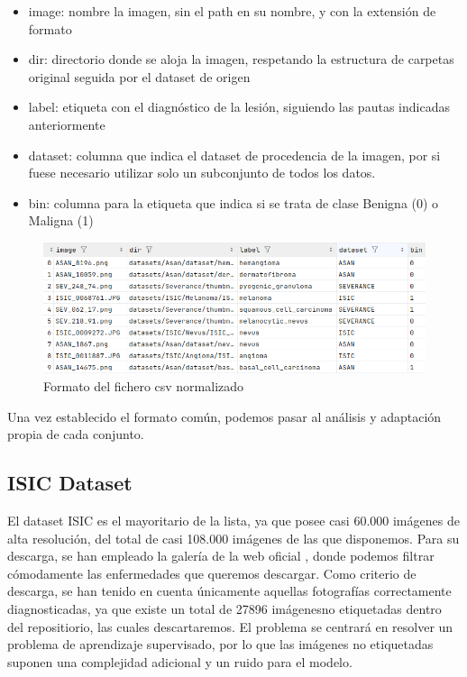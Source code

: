\begin{itemize}
	\item image: nombre la imagen, sin el path en su nombre, y con la extensión de formato
	\item dir: directorio donde se aloja la imagen, respetando la estructura de carpetas original seguida por el dataset de origen
	\item label: etiqueta con el diagnóstico de la lesión, siguiendo las pautas indicadas anteriormente
	\item dataset: columna que indica el dataset de procedencia de la imagen, por si fuese necesario utilizar solo un subconjunto de todos los datos.
	\item bin: columna para la etiqueta que indica si se trata de clase Benigna (0) o Maligna (1)
\end{itemize}

\begin{figure}[H]
	\centering
	\includegraphics[scale = 0.55]{imagenes/formatocsv.png}
	\caption{Formato del fichero csv normalizado}
	\label {formatocsv}
\end{figure}

Una vez establecido el formato común, podemos pasar al análisis y adaptación propia de cada conjunto.

\subsection{ISIC Dataset}

El dataset ISIC es el mayoritario de la lista, ya que posee casi 60.000 imágenes de alta resolución, del total de casi 108.000 imágenes de las que disponemos. Para su descarga, se han empleado la galería de la web oficial \cite{isicarchive}, donde podemos filtrar cómodamente las enfermedades que queremos descargar. Como criterio de descarga, se han tenido en cuenta únicamente aquellas fotografías correctamente diagnosticadas, ya que existe un total de 27896 imágenesno etiquetadas dentro del repositiorio, las cuales descartaremos. El problema se centrará en resolver un problema de aprendizaje supervisado, por lo que las imágenes no etiquetadas suponen una complejidad adicional y un ruido para el modelo.

